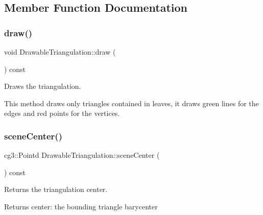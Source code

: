 \subsection{Member Function Documentation}
\mbox{\label{classDrawableTriangulation_a364e9b612571481930770fdfa9d68148}} 
\subsubsection{\texorpdfstring{draw()}{draw()}}
{\footnotesize\ttfamily void Drawable\+Triangulation\+::draw (\begin{DoxyParamCaption}{ }\end{DoxyParamCaption}) const}



Draws the triangulation. 

This method draws only triangles contained in leaves, it draws green lines for the edges and red points for the vertices. \mbox{\label{classDrawableTriangulation_a3198ae77285c354fd020f5b18df718f5}} 
\subsubsection{\texorpdfstring{scene\+Center()}{sceneCenter()}}
{\footnotesize\ttfamily cg3\+::\+Pointd Drawable\+Triangulation\+::scene\+Center (\begin{DoxyParamCaption}{ }\end{DoxyParamCaption}) const}



Returns the triangulation center. 

\begin{DoxyReturn}{Returns}
center\+: the bounding triangle barycenter 
\end{DoxyReturn}
\mbox{\label{classDrawableTriangulation_a0aee9121b146c327dbbd741c3dc58c0a}} 
